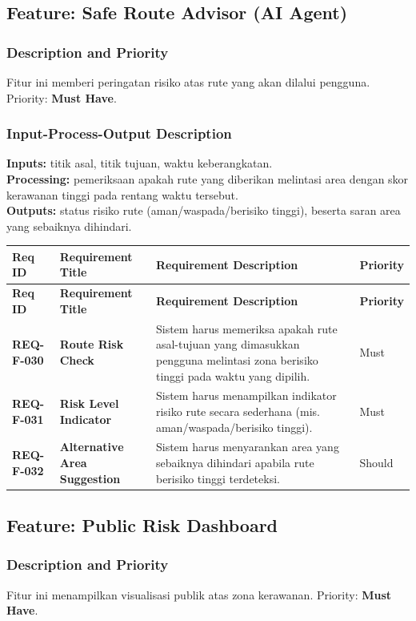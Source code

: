 \documentclass[11pt,a4paper]{article}
\newcommand{\req}[4]{\textbf{#1} & \textbf{#2} & #3 & #4 \\ \hline}
\begin{document}
\subsection{Feature: Safe Route Advisor (AI Agent)}
\subsubsection{Description and Priority}
Fitur ini memberi peringatan risiko atas rute yang akan dilalui pengguna. Priority: \textbf{Must Have}.

\subsubsection{Input-Process-Output Description}
\textbf{Inputs:} titik asal, titik tujuan, waktu keberangkatan.\\
\textbf{Processing:} pemeriksaan apakah rute yang diberikan melintasi area dengan skor kerawanan tinggi pada rentang waktu tersebut.\\
\textbf{Outputs:} status risiko rute (aman/waspada/berisiko tinggi), beserta saran area yang sebaiknya dihindari.

\begin{longtable}{|L{2.3cm}|L{4.0cm}|L{6.9cm}|L{1.6cm}|}
\hline
{}\textbf{Req ID} & \textbf{Requirement Title} & \textbf{Requirement Description} & \textbf{Priority} \\ \hline
\endfirsthead
\hline
{}\textbf{Req ID} & \textbf{Requirement Title} & \textbf{Requirement Description} & \textbf{Priority} \\ \hline
\endhead
\req{REQ-F-030}{Route Risk Check}{Sistem harus memeriksa apakah rute asal-tujuan yang dimasukkan pengguna melintasi zona berisiko tinggi pada waktu yang dipilih.}{Must}
\req{REQ-F-031}{Risk Level Indicator}{Sistem harus menampilkan indikator risiko rute secara sederhana (mis. aman/waspada/berisiko tinggi).}{Must}
\req{REQ-F-032}{Alternative Area Suggestion}{Sistem harus menyarankan area yang sebaiknya dihindari apabila rute berisiko tinggi terdeteksi.}{Should}
\end{longtable}

\subsection{Feature: Public Risk Dashboard}
\subsubsection{Description and Priority}
Fitur ini menampilkan visualisasi publik atas zona kerawanan. Priority: \textbf{Must Have}.
\end{document}
